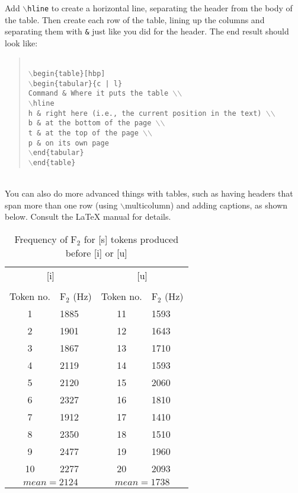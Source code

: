 \documentclass{article}
\begin{document}
Add \texttt{$\backslash$hline} to create a horizontal line, separating the header from the body of the table. Then create each row of the table, lining up the
columns and separating them with \texttt{\&} just like you did for the header. The end result should look like:
\begin{quotation}
\ \\
\texttt{$\backslash$begin\{table\}[hbp]}\\
\indent\texttt{$\backslash$begin\{tabular\}\{c | l\}}\\
\indent\texttt{Command \& Where it puts the table $\backslash$$\backslash$}\\
\indent\texttt{$\backslash$hline}\\
\indent\texttt{h \& right here (i.e., the current position in the text) $\backslash$$\backslash$}\\
\indent\texttt{b \& at the bottom of the page $\backslash$$\backslash$}\\
\indent\texttt{t \& at the top of the page $\backslash$$\backslash$}\\
\indent\texttt{p \& on its own page}\\
\indent\texttt{$\backslash$end\{tabular\}}\\
\texttt{$\backslash$end\{table\}}
\end{quotation}

\ \\

You can also do more advanced things with tables, such as having headers that span more than one row (using $\backslash$multicolumn) and adding captions, as shown
below. Consult the \LaTeX{} manual for details.

\begin{table}[hbp]
\begin{center}
\begin{tabular}{c l | c l}
\multicolumn{2}{c}{[i]} & \multicolumn{2}{c}{[u]} \\
 & & & \\
Token no. & F$_2$ (Hz) & Token no. & F$_2$ (Hz) \\
\hline
1 & 1885 & 11 & 1593 \\
2 & 1901 & 12 & 1643 \\
3 & 1867 & 13 & 1710 \\
4 & 2119 & 14 & 1593 \\
5 & 2120 & 15 & 2060 \\
6 & 2327 & 16 & 1810 \\
7 & 1912 & 17 & 1410 \\
8 & 2350 & 18 & 1510 \\
9 & 2477 & 19 & 1960 \\
10 & 2277 & 20 & 2093 \\
\multicolumn{2}{c}{$mean=2124$} & \multicolumn{2}{c}{$mean=1738$}
\end{tabular}
\end{center}
\caption{Frequency of F$_2$ for [s] tokens produced before [i] or [u]}
\end{table}
\end{document}
